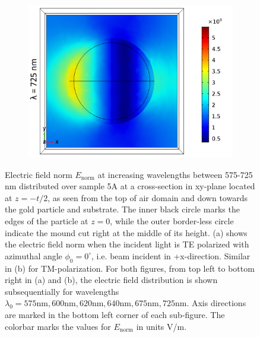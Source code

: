 \begin{figure}[htb!]
   \begin{subfigure}{0.32\textwidth}
        \centering
        \includegraphics[width=\linewidth]{figures/ch4/S5A/FieldDistribution/LSPR/Sample5A_TM_Slice@z=-05t_wl=725_notitle.png}
   \end{subfigure}
   \vspace{0.7cm}
   \caption{Electric field norm $E_{\text{norm}}$ at increasing wavelengths between 575-725 nm distributed over sample 5A at a cross-section in xy-plane located at $z=-t/2$, as seen from the top of air domain and down towards the gold particle and substrate. The inner black circle marks the edges of the particle at $z=0$, while the outer border-less circle indicate the mound cut right at the middle of its height. (a) shows the electric field norm when the incident light is TE polarized with azimuthal angle $\phi_0=0^\circ$, i.e. beam incident in +x-direction. Similar in (b) for TM-polarization. For both figures, from top left to bottom right in (a) and (b), the electric field distribution is shown subsequentially for wavelengths $\lambda_0=575 \text{nm}, 600 \text{nm}, 620 \text{nm}, 640 \text{nm}, 675 \text{nm}, 725 \text{nm}$. Axis directions are marked in the bottom left corner of each sub-figure. The colorbar marks the values for $E_{\text{norm}}$ in units V/m.}
   \label{fig:S5A_normE_distribution_LSPR}
\end{figure}



